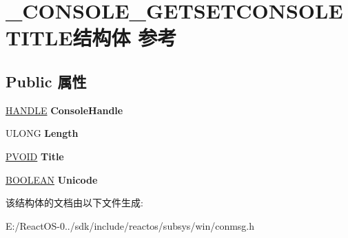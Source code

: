\hypertarget{struct___c_o_n_s_o_l_e___g_e_t_s_e_t_c_o_n_s_o_l_e_t_i_t_l_e}{}\section{\+\_\+\+C\+O\+N\+S\+O\+L\+E\+\_\+\+G\+E\+T\+S\+E\+T\+C\+O\+N\+S\+O\+L\+E\+T\+I\+T\+L\+E结构体 参考}
\label{struct___c_o_n_s_o_l_e___g_e_t_s_e_t_c_o_n_s_o_l_e_t_i_t_l_e}
\subsection*{Public 属性}
\begin{DoxyCompactItemize}
\item 
\mbox{\label{struct___c_o_n_s_o_l_e___g_e_t_s_e_t_c_o_n_s_o_l_e_t_i_t_l_e_a333b0abe6a9abda2f4c72d1cd5bc61e7}} 
\hyperlink{interfacevoid}{H\+A\+N\+D\+LE} {\bfseries Console\+Handle}
\item 
\mbox{\label{struct___c_o_n_s_o_l_e___g_e_t_s_e_t_c_o_n_s_o_l_e_t_i_t_l_e_a0d24bbf341e8f96f80a6e798305a630f}} 
U\+L\+O\+NG {\bfseries Length}
\item 
\mbox{\label{struct___c_o_n_s_o_l_e___g_e_t_s_e_t_c_o_n_s_o_l_e_t_i_t_l_e_afd98ee171b504aded5526476c8a47e52}} 
\hyperlink{interfacevoid}{P\+V\+O\+ID} {\bfseries Title}
\item 
\mbox{\label{struct___c_o_n_s_o_l_e___g_e_t_s_e_t_c_o_n_s_o_l_e_t_i_t_l_e_ad3641b07db73ecfe0c1f9651d6474774}} 
\hyperlink{_processor_bind_8h_a112e3146cb38b6ee95e64d85842e380a}{B\+O\+O\+L\+E\+AN} {\bfseries Unicode}
\end{DoxyCompactItemize}


该结构体的文档由以下文件生成\+:\begin{DoxyCompactItemize}
\item 
E\+:/\+React\+O\+S-\/0../sdk/include/reactos/subsys/win/conmsg.\+h\end{DoxyCompactItemize}
